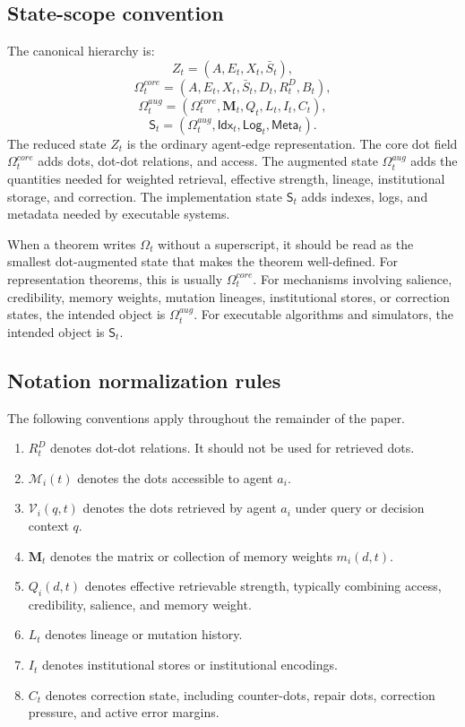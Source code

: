 \documentclass[11pt]{article}
\theoremstyle{remark}
\begin{document}
\subsection{State-scope convention}\label{state-scope-convention}

The canonical hierarchy is:
\[
Z_t=(A,E_t,X_t,\bar S_t),
\]
\[
\Omega_t^{core}=(A,E_t,X_t,\bar S_t,D_t,R_t^D,B_t),
\]
\[
\Omega_t^{aug}=(\Omega_t^{core},\mathbf M_t,Q_t,L_t,I_t,C_t),
\]
\[
\mathsf S_t=(\Omega_t^{aug},\mathsf{Idx}_t,\mathsf{Log}_t,\mathsf{Meta}_t).
\]
The reduced state $Z_t$ is the ordinary agent-edge representation. The core dot field $\Omega_t^{core}$ adds dots, dot-dot relations, and access. The augmented state $\Omega_t^{aug}$ adds the quantities needed for weighted retrieval, effective strength, lineage, institutional storage, and correction. The implementation state $\mathsf S_t$ adds indexes, logs, and metadata needed by executable systems.

When a theorem writes $\Omega_t$ without a superscript, it should be read as the smallest dot-augmented state that makes the theorem well-defined. For representation theorems, this is usually $\Omega_t^{core}$. For mechanisms involving salience, credibility, memory weights, mutation lineages, institutional stores, or correction states, the intended object is $\Omega_t^{aug}$. For executable algorithms and simulators, the intended object is $\mathsf S_t$.

\subsection{Notation normalization rules}\label{notation-normalization-rules}

The following conventions apply throughout the remainder of the paper.

\begin{enumerate}[leftmargin=*]
\item $R_t^D$ denotes dot-dot relations. It should not be used for retrieved dots.
\item $\mathcal M_i(t)$ denotes the dots accessible to agent $a_i$.
\item $\mathcal V_i(q,t)$ denotes the dots retrieved by agent $a_i$ under query or decision context $q$.
\item $\mathbf M_t$ denotes the matrix or collection of memory weights $m_i(d,t)$.
\item $Q_i(d,t)$ denotes effective retrievable strength, typically combining access, credibility, salience, and memory weight.
\item $L_t$ denotes lineage or mutation history.
\item $I_t$ denotes institutional stores or institutional encodings.
\item $C_t$ denotes correction state, including counter-dots, repair dots, correction pressure, and active error margins.
\end{enumerate}
\end{document}
